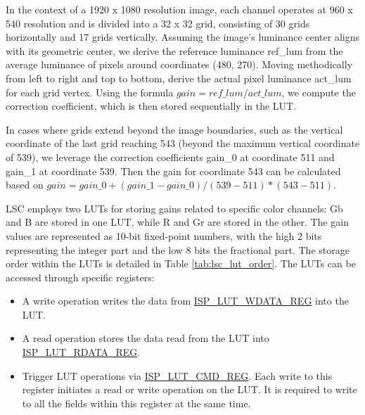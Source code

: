 \documentclass[main\_\_EN.tex]{subfiles}
\begin{document}
In the context of a 1920 x 1080 resolution image, each channel operates at 960 x 540 resolution and is divided into a 32 x 32 grid, consisting of 30 grids horizontally and 17 grids vertically. Assuming the image's luminance center aligns with its geometric center, we derive the reference luminance ref\_lum from the average luminance of pixels around coordinates (480, 270). Moving methodically from left to right and top to bottom, derive the actual pixel luminance act\_lum for each grid vertex. Using the formula $gain = ref\_lum / act\_lum$, we compute the correction coefficient, which is then stored sequentially in the LUT.

In cases where grids extend beyond the image boundaries, such as the vertical coordinate of the last grid reaching 543 (beyond the maximum vertical coordinate of 539), we leverage the correction coefficients gain\_0 at coordinate 511 and gain\_1 at coordinate 539. Then the gain for coordinate 543 can be calculated based on $gain = gain\_0 + (gain\_1 - gain\_0) / (539 - 511) * (543 - 511)$.

LSC employs two LUTs for storing gains related to specific color channels: Gb and B are stored in one LUT, while R and Gr are stored in the other. The gain values are represented as 10-bit fixed-point numbers, with the high 2 bits representing the integer part and the low 8 bits the fractional part. The storage order within the LUTs is detailed in Table \ref{tab:lsc_lut_order}. The LUTs can be accessed through specific registers:
\begin{itemize}
    \item A write operation writes the data from \hyperref[regdesc:ISPLUTWDATAREG]{ISP\_LUT\_WDATA\_REG} into the LUT.
    \item A read operation stores the data read from the LUT into \hyperref[regdesc:ISPLUTRDATAREG]{ISP\_LUT\_RDATA\_REG}.
    \item Trigger LUT operations via \hyperref[regdesc:ISPLUTCMDREG]{ISP\_LUT\_CMD\_REG}. Each write to this register initiates a read or write operation on the LUT. It is required to write to all the fields within this register at the same time.
\end{itemize}
\end{document}
